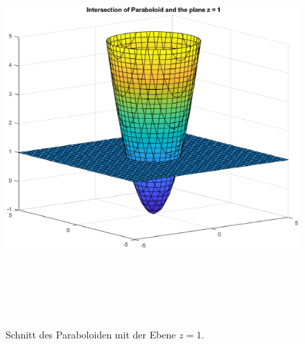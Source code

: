 {\begin{figure}[ht]
\begin{center}
\includegraphics[width=15cm, height=15cm]{../A/analysis/isolines_and_isosurfaces_001_bi2.eps}
\caption{Schnitt des Paraboloiden mit der Ebene $z=1$.}
\label{z=1}
\end{center}
\end{figure}

}
